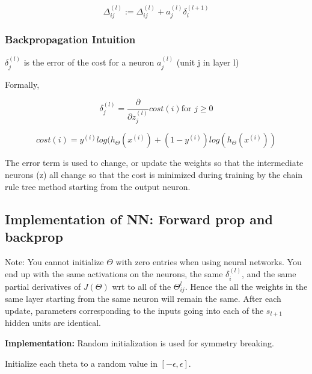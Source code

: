 \documentclass{article}
\begin{document}
\begin{equation}
    \Delta_{ij}^{(l)} := \Delta_{ij}^{(l)} + a_j^{(l)} \delta_i^{(l+1)}
\end{equation}



\subsubsection{Backpropagation Intuition}

$\delta_j^{(l)}$ is the error of the cost for a neuron $a_j^{(l)}$ (unit j in layer l)

Formally, 

\begin{equation}
    \delta_j^{(l)} = \frac{\partial}{\partial z_j^{(l)}} cost (i) \text{for } j \geq 0
\end{equation}

\begin{equation}
    cost(i) = y^{(i)} log(h_{\Theta} (x^{(i)}) + (1 - y^{(i)}) log(h_{\Theta} (x^{(i)}))
\end{equation}

The error term is used to change, or update the weights so that the intermediate neurons (z) all change so that the cost is minimized during training by the chain rule tree method starting from the output neuron.


\subsection{Implementation of NN: Forward prop and backprop}

\begin{myboxr}
Note: You cannot initialize $\Theta$ with zero entries when using neural networks. You end up with the same activations on the neurons, the same $\delta_i^{(l)}$, and the same partial derivatives of $J(\Theta)$ wrt to all of the $\Theta_{ij}^{l}$. Hence the all the weights in the same layer starting from the same neuron will remain the same. After each update, parameters corresponding to the inputs going into each of the $s_{l+1}$ hidden units are identical.
\end{myboxr}

\begin{mybox}
\textbf{Implementation:} Random initialization is used for symmetry breaking. 

Initialize each theta to a random value in $[- \epsilon, \epsilon]$.

\end{mybox}
\end{document}
